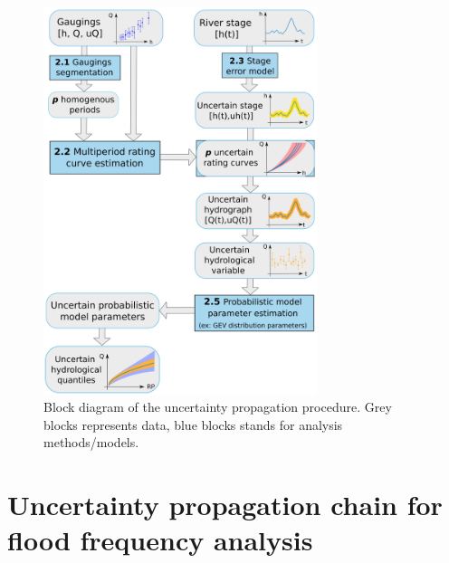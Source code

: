 \documentclass[11pt]{article}
\begin{document}
    \begin{figure}[h!]
    \centering
        \includegraphics[width = 8cm]{Figs/1-uTotSchema.png}
        \caption{Block diagram of the uncertainty propagation procedure. Grey blocks represents data, blue blocks stands for analysis methods/models.}
        \label{fig:ChProp}
    \end{figure}


\section{Uncertainty propagation chain for flood frequency analysis}
    
    
    
\end{document}
